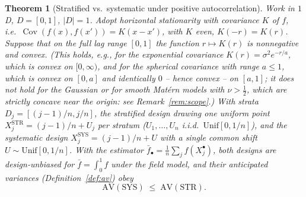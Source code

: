 \documentclass{amsart}
\newtheorem{theorem}{Theorem}
\theoremstyle{definition}
\newcommand{\Cov}{\operatorname{Cov}}
\begin{document}
\begin{theorem}[Stratified vs.\ systematic under positive
autocorrelation]\label{thm:sys}
Work in $1$D, $D=[0,1]$, $|D|=1$. Adopt horizontal stationarity with
covariance $K$ of $f$, i.e.\ $\Cov(f(x),f(x'))=K(x-x')$, with $K$ even,
$K(-r)=K(r)$. Suppose that on the full lag range $[0,1]$ the function
$r\mapsto K(r)$ is nonnegative and \emph{convex}. (This holds, e.g., for the
exponential covariance $K(r)=\sigma^2 e^{-r/a}$, which is convex on
$[0,\infty)$, and for the spherical covariance with range $a\le1$, which is
convex on $[0,a]$ and identically $0$ -- hence convex -- on $[a,1]$; it does
\emph{not} hold for the Gaussian or for smooth Mat\'ern models with
$\nu>\tfrac12$, which are strictly concave near the origin: see
Remark~\ref{rem:scope}.) With strata $D_j=[(j-1)/n,j/n]$, the stratified design drawing one
uniform point $X_j^{\mathrm{STR}}=(j-1)/n+U_j$ per stratum
($U_1,\dots,U_n$ i.i.d.\ $\mathrm{Unif}[0,1/n]$), and the systematic design
$X_j^{\mathrm{SYS}}=(j-1)/n+U$ with a single common shift
$U\sim\mathrm{Unif}[0,1/n]$. With the estimator
$\bar f_\bullet=\frac1n\sum_j f(X_j^\bullet)$, both designs are
design-unbiased for $\bar f=\int_0^1 f$ under the field model, and their
\emph{anticipated variances} (Definition~\ref{def:av}) obey
\begin{equation}\label{eq:sysleqstr}
\mathrm{AV}(\mathrm{SYS})\;\le\;\mathrm{AV}(\mathrm{STR}).
\end{equation}
\end{theorem}
\end{document}
